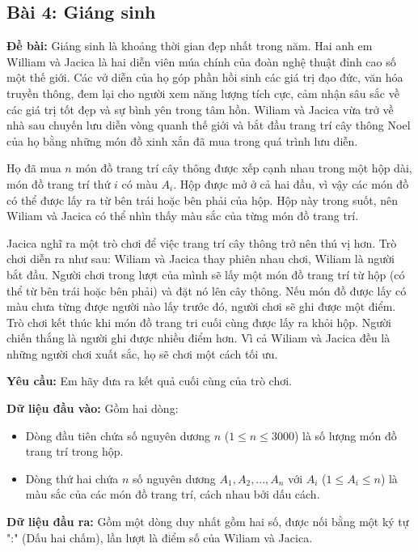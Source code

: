 \documentclass[12pt]{scrartcl}  %
\begin{document}
\subsection{Bài 4: Giáng sinh}
\textbf{Đề bài:}
Giáng sinh là khoảng thời gian đẹp nhất trong năm. Hai anh em William và Jacica là hai diễn viên múa chính
của đoàn nghệ thuật đỉnh cao số một thế giới. Các vở diễn của họ góp phần hồi sinh các giá trị đạo đức, văn hóa truyền thông, 
đem lại cho người xem năng lượng tích cực, cảm nhận sâu sắc về các giá trị tốt đẹp và sự bình yên trong tâm hồn. 
Wiliam và Jacica vừa trở về nhà sau chuyến lưu diễn vòng quanh thế giới và bắt đầu trang trí cây thông Noel của họ bằng những món đồ xinh xắn đã mua trong quá trình lưu diễn.

Họ đã mua $n$ món đồ trang trí cây thông được xếp cạnh nhau trong một hộp dài, món đồ trang trí thứ $i$ có màu $A_i$. 
Hộp được mở ở cả hai đầu, vì vậy các món đồ có thể được lấy ra từ bên trái hoặc bên phải của hộp. Hộp này trong suốt, nên Wiliam và Jacica có thể nhìn thấy màu sắc của từng món đồ trang trí.

Jacica nghĩ ra một trò chơi để việc trang trí cây thông trở nên thú vị hơn. Trò chơi diễn ra như sau: Wiliam và Jacica thay phiên nhau chơi, Wiliam là người bắt đầu. Người chơi trong lượt của mình sẽ lấy một món đồ trang trí từ hộp (có thể từ bên trái hoặc bên phải) và đặt nó lên cây thông. 
Nếu món đồ được lấy có màu chưa từng được người nào lấy trước đó, người chơi sẽ ghi được một điểm. Trò chơi kết thúc khi món đồ trang tri cuối cùng được lấy ra khỏi hộp. Người chiến thắng là người ghi được nhiều điểm hơn. Vì cả Wiliam và Jacica đều là những người chơi xuất sắc, họ sẽ chơi một cách tối ưu.

\textbf{Yêu cầu:}
Em hãy đưa ra kết quả cuối cùng của trò chơi. 

\textbf{Dữ liệu đầu vào:}
Gồm hai dòng:
\begin{itemize}
    \item Dòng đầu tiên chứa số nguyên dương $n$ ($1 \leq n \leq 3000$) là số lượng món đồ trang trí trong hộp.
    \item Dòng thứ hai chứa $n$ số nguyên dương $A_1, A_2, ..., A_n$ với $A_i$ ($1 \leq A_i \leq n$) là màu sắc của các món đồ trang trí, cách nhau bởi dấu cách.
\end{itemize}

\textbf{Dữ liệu đầu ra:}
Gồm một dòng duy nhất gồm hai số, được nối bằng một ký tự ":" (Dấu hai chấm), lần lượt là điểm số của Wiliam và Jacica.
\end{document}
